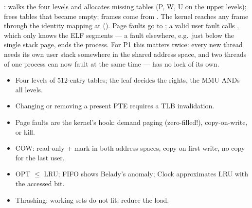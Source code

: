 \begin{swebbox}
:  walks the four
levels and allocates missing tables (P, W, U on the upper levels);
 frees tables that became empty; frames come from
. The kernel reaches any frame through the
identity mapping at 
(). Page faults go to
; a valid user fault calls
, which only knows the ELF segments --- a fault
elsewhere, e.g.\ just below the single stack page, ends the process.
For P1 this matters twice: every new thread needs its own user stack
somewhere in the shared address space, and two threads of one process can
now fault at the same time ---  has no lock of its own.
\end{swebbox}

\begin{keybox}
\begin{itemize}
  \item Four levels of 512-entry tables; the leaf decides the rights, the
    MMU ANDs all levels.
  \item Changing or removing a present PTE requires a TLB invalidation.
  \item Page faults are the kernel's hook: demand paging (zero-filled!),
    copy-on-write, or kill.
  \item COW: read-only + mark in both address spaces, copy on first write,
    no copy for the last user.
  \item OPT $\le$ LRU; FIFO shows Belady's anomaly; Clock approximates LRU
    with the accessed bit.
  \item Thrashing: working sets do not fit; reduce the load.
\end{itemize}
\end{keybox}
